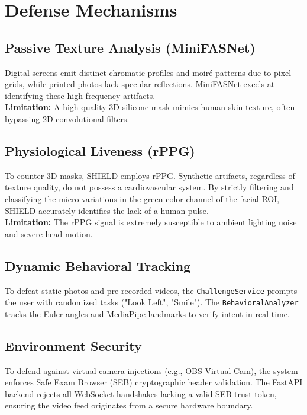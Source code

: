 \documentclass[12pt, a4paper]{report}
\begin{document}
\section{Defense Mechanisms}

\subsection{Passive Texture Analysis (MiniFASNet)}
Digital screens emit distinct chromatic profiles and moiré patterns due to pixel grids, while printed photos lack specular reflections. MiniFASNet excels at identifying these high-frequency artifacts. 
\\ \textbf{Limitation:} A high-quality 3D silicone mask mimics human skin texture, often bypassing 2D convolutional filters.

\subsection{Physiological Liveness (rPPG)}
To counter 3D masks, SHIELD employs rPPG. Synthetic artifacts, regardless of texture quality, do not possess a cardiovascular system. By strictly filtering and classifying the micro-variations in the green color channel of the facial ROI, SHIELD accurately identifies the lack of a human pulse.
\\ \textbf{Limitation:} The rPPG signal is extremely susceptible to ambient lighting noise and severe head motion.

\subsection{Dynamic Behavioral Tracking}
To defeat static photos and pre-recorded videos, the \texttt{ChallengeService} prompts the user with randomized tasks ("Look Left", "Smile"). The \texttt{BehavioralAnalyzer} tracks the Euler angles and MediaPipe landmarks to verify intent in real-time.

\subsection{Environment Security}
To defend against virtual camera injections (e.g., OBS Virtual Cam), the system enforces Safe Exam Browser (SEB) cryptographic header validation. The FastAPI backend rejects all WebSocket handshakes lacking a valid SEB trust token, ensuring the video feed originates from a secure hardware boundary.
\end{document}
